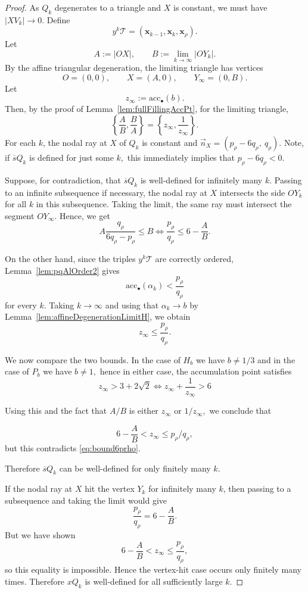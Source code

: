 \documentclass[10pt,a4paper]{amsart}
\newcommand{\Tt}{\mathcal{T}}
\newcommand{\acc}{\mathrm{acc}}
\newcommand{\ov}{\overline}
\begin{document}
\begin{proof}
As $Q_k$ degenerates to a triangle and $X$ is constant, we must have $|XV_k| \to 0.$
Define
\[
        y^k\Tt=(\bm{x}_{k-1},\bm{x}_k,\bm{x}_\rho).
\]
Let
\[
        A:=|OX|,
        \qquad
        B:=\lim_{k\to\infty}|OY_k|.
\]
By the affine triangular degeneration, the limiting triangle has vertices
\[
        O=(0,0),\qquad X=(A,0),\qquad Y_\infty=(0,B).
\]
Let
\[
        z_\infty:=\acc_\bullet(b).
\]
Then, by the proof of Lemma~\ref{lem:fullFillingAccPt}, for the limiting triangle,
\[
        \left\{\frac{A}{B},\frac{B}{A}\right\}
        =
        \left\{z_\infty,\frac{1}{z_\infty}\right\}.
\]
For each $k$, the nodal ray at $X$ of $Q_k$ is constant and $\vec n_X=(p_\rho-6q_\rho,\ q_\rho).$ Note, if $\ov{s}Q_k$ is defined for just some $k,$ this immediately implies that $p_\rho-6q_\rho<0$. 

Suppose, for contradiction, that $\ov{s}Q_k$ is well-defined for infinitely
many $k$. Passing to an infinite subsequence if necessary, the nodal ray at
$X$ intersects the side $OY_k$ for all $k$ in this subsequence. Taking the
limit, the same ray must intersect the segment $OY_\infty$. Hence, we get
\begin{equation} \label{eq:bound6prho}
        A \frac{q_\rho}{6q_\rho-p_\rho}\leq B \iff  \frac{p_\rho}{q_\rho}
        \leq
        6-\frac{A}{B}.
\end{equation}


On the other hand, since the triples $y^k\Tt$ are correctly ordered,
Lemma~\ref{lem:pqAlOrder2} gives
\[
        \acc_\bullet(\alpha_k)<\frac{p_\rho}{q_\rho}
\]
for every $k$. Taking $k\to\infty$ and using that $\alpha_k\to b$ by Lemma~\ref{lem:affineDegenerationLimitH}, we obtain
\[
        z_\infty\leq \frac{p_\rho}{q_\rho}.
\]

We now compare the two bounds. In the case of $H_b$ we have $b \neq 1/3$ and in the case of $P_b$ we have $b \neq 1,$ hence in either case, the accumulation point
satisfies
\[
        z_\infty>3+2\sqrt{2} \iff  z_\infty+\frac{1}{z_\infty}>6
\]

Using this and the fact that $A/B$ is either $z_\infty$ or $1/z_\infty,$ we conclude that 

\[
        6-\frac{A}{B}<z_\infty \leq p_\rho/q_\rho,
\]
but this contradicts \eqref{eq:bound6prho}.

Therefore $\ov{s}Q_k$ can be well-defined for only
finitely many $k$. 

If the nodal ray at \(X\) hit the vertex \(Y_k\) for infinitely many \(k\),
then passing to a subsequence and taking the limit would give
\[
        \frac{p_\rho}{q_\rho}=6-\frac{A}{B}.
\]
But we have shown
\[
        6-\frac{A}{B}<z_\infty\leq \frac{p_\rho}{q_\rho},
\]
so this equality is impossible. Hence the vertex-hit case occurs only
finitely many times. Therefore $xQ_k$ is
well-defined for all sufficiently large $k$.
\end{proof}
\end{document}
